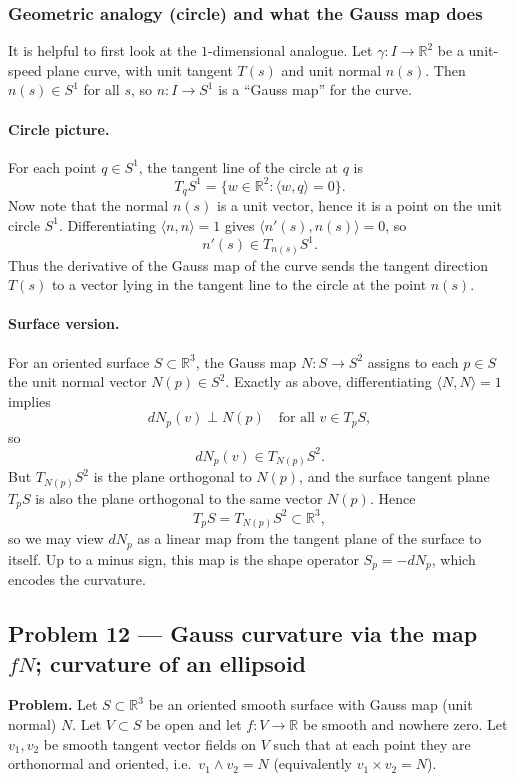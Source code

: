 \documentclass[12pt,a4paper]{article}
\theoremstyle{plain}
\theoremstyle{definition}      %
\begin{document}
	\subsubsection*{Geometric analogy (circle) and what the Gauss map does}
	
	It is helpful to first look at the $1$-dimensional analogue.
	Let $\gamma:I\to\mathbb R^2$ be a unit-speed plane curve, with unit tangent $T(s)$ and unit normal $n(s)$.
	Then $n(s)\in S^1$ for all $s$, so $n:I\to S^1$ is a ``Gauss map'' for the curve.
	
	\paragraph{Circle picture.}
	For each point $q\in S^1$, the tangent line of the circle at $q$ is
	\[
	T_qS^1=\{w\in\mathbb R^2:\langle w,q\rangle=0\}.
	\]
	Now note that the normal $n(s)$ is a unit vector, hence it is a point on the unit circle $S^1$.
	Differentiating $\langle n,n\rangle=1$ gives $\langle n'(s),n(s)\rangle=0$, so
	\[
	n'(s)\in T_{n(s)}S^1.
	\]
	Thus the derivative of the Gauss map of the curve sends the tangent direction $T(s)$ to a vector
	lying in the tangent line to the circle at the point $n(s)$.
	
	\paragraph{Surface version.}
	For an oriented surface $S\subset\mathbb R^3$, the Gauss map $N:S\to S^2$ assigns to each
	$p\in S$ the unit normal vector $N(p)\in S^2$.
	Exactly as above, differentiating $\langle N,N\rangle=1$ implies
	\[
	dN_p(v)\perp N(p)\quad\text{for all }v\in T_pS,
	\]
	so
	\[
	dN_p(v)\in T_{N(p)}S^2.
	\]
	But $T_{N(p)}S^2$ is the plane orthogonal to $N(p)$, and the surface tangent plane $T_pS$ is
	also the plane orthogonal to the same vector $N(p)$. Hence
	\[
	T_pS = T_{N(p)}S^2 \subset \mathbb R^3,
	\]
	so we may view $dN_p$ as a linear map from the tangent plane of the surface to itself.
	Up to a minus sign, this map is the shape operator $S_p=-dN_p$, which encodes the curvature.
	\subsection*{Problem 12 — Gauss curvature via the map $fN$; curvature of an ellipsoid}
	
	\textbf{Problem.}
	Let $S\subset\mathbb R^3$ be an oriented smooth surface with Gauss map (unit normal) $N$.
	Let $V\subset S$ be open and let $f:V\to\mathbb R$ be smooth and nowhere zero.
	Let $v_1,v_2$ be smooth tangent vector fields on $V$ such that at each point they are orthonormal and oriented,
	i.e.\ $v_1\wedge v_2=N$ (equivalently $v_1\times v_2=N$).
	
\end{document}
